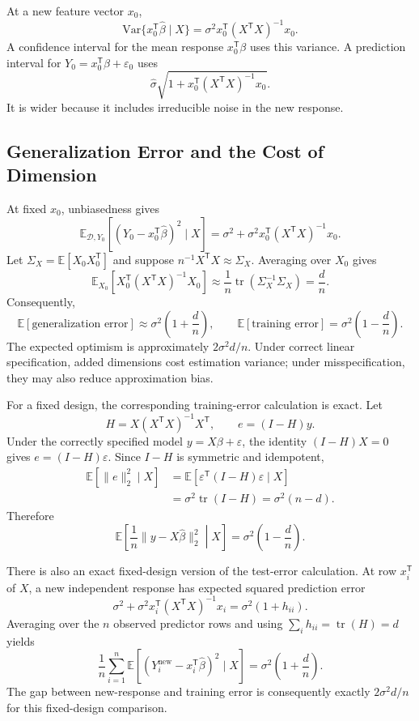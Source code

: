 \documentclass[12pt,oneside]{book}
\numberwithin{equation}{section}
\theoremstyle{definition}
\theoremstyle{plain}
\theoremstyle{remark}
\newcommand{\E}{\mathbb{E}}
\newcommand{\Var}{\mathrm{Var}}
\newcommand{\tr}{\operatorname{tr}}
\begin{document}
At a new feature vector $x_0$,
\[
 \Var\{x_0^\mathsf T\widehat\beta\mid X\}
 =\sigma^2x_0^\mathsf T(X^\mathsf TX)^{-1}x_0.
\]
A confidence interval for the mean response $x_0^\mathsf T\beta$ uses this
variance. A prediction interval for
$Y_0=x_0^\mathsf T\beta+\varepsilon_0$ uses
\begin{equation}
 \widehat\sigma
 \sqrt{1+x_0^\mathsf T(X^\mathsf TX)^{-1}x_0}.
 \label{eq:linear-prediction-se}
\end{equation}
It is wider because it includes irreducible noise in the new response.

\subsection{Generalization Error and the Cost of Dimension}

At fixed $x_0$, unbiasedness gives
\[
 \E_{\mathcal D,Y_0}
 [(Y_0-x_0^\mathsf T\widehat\beta)^2\mid X]
 =\sigma^2+\sigma^2x_0^\mathsf T
   (X^\mathsf TX)^{-1}x_0.
\]
Let $\Sigma_X=\E[X_0X_0^\mathsf T]$ and suppose
$n^{-1}X^\mathsf TX\approx\Sigma_X$. Averaging over $X_0$ gives
\[
 \E_{X_0}[X_0^\mathsf T(X^\mathsf TX)^{-1}X_0]
 \approx\frac1n\tr(\Sigma_X^{-1}\Sigma_X)=\frac dn.
\]
Consequently,
\begin{equation}
 \E[\text{generalization error}]
 \approx\sigma^2\left(1+\frac dn\right),
 \qquad
 \E[\text{training error}]
 =\sigma^2\left(1-\frac dn\right).
 \label{eq:linear-optimism}
\end{equation}
The expected optimism is approximately $2\sigma^2d/n$. Under correct linear
specification, added dimensions cost estimation variance; under
misspecification, they may also reduce approximation bias.

For a fixed design, the corresponding training-error calculation is exact.
Let
\[
 H=X(X^\mathsf TX)^{-1}X^\mathsf T,
 \qquad e=(I-H)y.
\]
Under the correctly specified model $y=X\beta+\varepsilon$, the identity
$(I-H)X=0$ gives $e=(I-H)\varepsilon$. Since $I-H$ is symmetric and
idempotent,
\begin{align*}
 \E[\lVert e\rVert_2^2\mid X]
 &=\E[\varepsilon^\mathsf T(I-H)\varepsilon\mid X]\\
 &=\sigma^2\tr(I-H)
 =\sigma^2(n-d).
\end{align*}
Therefore
\[
 \E\left[\frac1n\lVert y-X\widehat\beta\rVert_2^2
 \middle|X\right]
 =\sigma^2\left(1-\frac dn\right).
\]

There is also an exact fixed-design version of the test-error calculation.
At row $x_i^\mathsf T$ of $X$, a new independent response has expected squared
prediction error
\[
 \sigma^2+\sigma^2x_i^\mathsf T
 (X^\mathsf TX)^{-1}x_i
 =\sigma^2(1+h_{ii}).
\]
Averaging over the $n$ observed predictor rows and using
$\sum_i h_{ii}=\tr(H)=d$ yields
\[
 \frac1n\sum_{i=1}^n
 \E[(Y_i^{\mathrm{new}}-x_i^\mathsf T\widehat\beta)^2\mid X]
 =\sigma^2\left(1+\frac dn\right).
\]
The gap between new-response and training error is consequently exactly
$2\sigma^2d/n$ for this fixed-design comparison.
\end{document}
